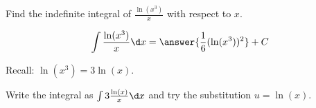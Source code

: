 \documentclass{ximera}
\author{Gregory Hartman \and Matthew Carr \and Bobby Ramsey}
\begin{document}
\begin{exercise}

Find the indefinite integral of $\frac{\ln(x^3)}{x}$ with respect to $x$.

\[
\int \frac{\ln(x^3)}{x}\d x=\answer{\frac{1}{6}(\ln(x^3))^2}+C
\]

\begin{hint}
	Recall: $\ln(x^3)=3\ln(x)$. 
\end{hint}
\begin{hint}
	Write the integral as $\int 3\frac{\ln(x)}{x}\d x$ and try the substitution $u=\ln(x)$.
\end{hint}

\end{exercise}
\end{document}
